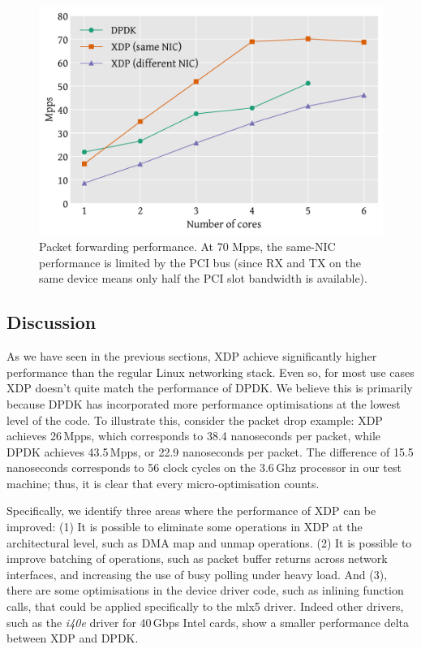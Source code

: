 \documentclass[10pt,sigconf]{acmart}
\begin{document}
\begin{figure}[t]
\centering
\includegraphics[width=\linewidth]{figures/redirect-test.pdf}
\caption{\label{fig:redirect-test} Packet forwarding performance. At 70 Mpps,
  the same-NIC performance is limited by the PCI bus (since RX and TX on the
  same device means only half the PCI slot bandwidth is available).}
\end{figure}

\subsection{Discussion}
\label{sec:perf-discussion}

As we have seen in the previous sections, XDP achieve significantly higher
performance than the regular Linux networking stack. Even so, for most use cases
XDP doesn't quite match the performance of DPDK. We believe this is primarily
because DPDK has incorporated more performance optimisations at the lowest level
of the code. To illustrate this, consider the packet drop example: XDP achieves
26\,Mpps, which corresponds to 38.4 nanoseconds per packet, while DPDK achieves
43.5\,Mpps, or 22.9 nanoseconds per packet. The difference of 15.5 nanoseconds
corresponds to 56 clock cycles on the 3.6\,Ghz processor in our test machine;
thus, it is clear that every micro-optimisation counts.

Specifically, we identify three areas where the performance of XDP can be
improved: (1) It is possible to eliminate some operations in XDP at the
architectural level, such as DMA map and unmap operations. (2) It is possible to
improve batching of operations, such as packet buffer returns across network
interfaces, and increasing the use of busy polling under heavy load. And (3),
there are some optimisations in the device driver code, such as inlining
function calls, that could be applied specifically to the mlx5 driver. Indeed
other drivers, such as the \emph{i40e} driver for 40\,Gbps Intel cards, show a
smaller performance delta between XDP and DPDK.
\end{document}
